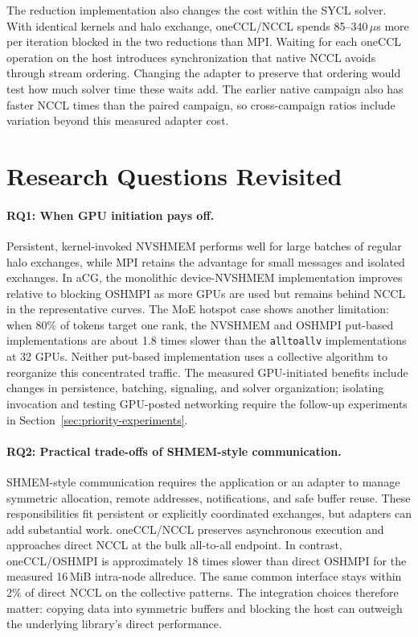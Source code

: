 The reduction implementation also changes the cost within the SYCL solver. With identical kernels and halo exchange, oneCCL/NCCL spends 85--340\,$\mu$s more per iteration blocked in the two reductions than MPI. Waiting for each oneCCL operation on the host introduces synchronization that native NCCL avoids through stream ordering. Changing the adapter to preserve that ordering would test how much solver time these waits add. The earlier native campaign also has faster NCCL times than the paired campaign, so cross-campaign ratios include variation beyond this measured adapter cost.

\section{Research Questions Revisited}

\paragraph{RQ1: When GPU initiation pays off.}
Persistent, kernel-invoked NVSHMEM performs well for large batches of regular halo exchanges, while MPI retains the advantage for small messages and isolated exchanges. In aCG, the monolithic device-NVSHMEM implementation improves relative to blocking OSHMPI as more GPUs are used but remains behind NCCL in the representative curves. The MoE hotspot case shows another limitation: when 80\% of tokens target one rank, the NVSHMEM and OSHMPI put-based implementations are about 1.8 times slower than the \texttt{alltoallv} implementations at 32 GPUs. Neither put-based implementation uses a collective algorithm to reorganize this concentrated traffic. The measured GPU-initiated benefits include changes in persistence, batching, signaling, and solver organization; isolating invocation and testing GPU-posted networking require the follow-up experiments in Section~\ref{sec:priority-experiments}.

\paragraph{RQ2: Practical trade-offs of SHMEM-style communication.}
SHMEM-style communication requires the application or an adapter to manage symmetric allocation, remote addresses, notifications, and safe buffer reuse. These responsibilities fit persistent or explicitly coordinated exchanges, but adapters can add substantial work. oneCCL/NCCL preserves asynchronous execution and approaches direct NCCL at the bulk all-to-all endpoint. In contrast, oneCCL/OSHMPI is approximately 18 times slower than direct OSHMPI for the measured 16\,MiB intra-node allreduce. The same common interface stays within 2\% of direct NCCL on the collective patterns. The integration choices therefore matter: copying data into symmetric buffers and blocking the host can outweigh the underlying library's direct performance.

